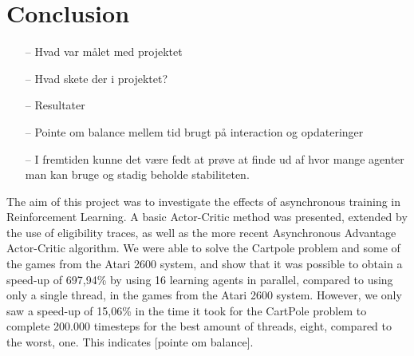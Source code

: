 \documentclass[11pt]{article}
\begin{document}
\section{Conclusion}

\begin{itemize}
    \item[--] Hvad var målet med projektet
    \item[--] Hvad skete der i projektet?
    \item[--] Resultater
    \item[--] Pointe om balance mellem tid brugt på interaction og opdateringer
    \item[--] I fremtiden kunne det være fedt at prøve at finde ud af hvor mange agenter man kan bruge og stadig beholde stabiliteten.
\end{itemize}


The aim of this project was to investigate the effects of asynchronous
training in Reinforcement Learning.
A basic Actor-Critic method was presented, extended by the use of eligibility traces,
as well as the more recent Asynchronous Advantage Actor-Critic algorithm.
We were able to solve the Cartpole problem and some of the games from the
Atari 2600 system, and show that it was possible to obtain a
speed-up of 697,94\% by using 16 learning agents in parallel, compared to
using only a single thread, in the games from the Atari 2600 system.
However, we only saw a speed-up of 15,06\% in the time it took for the CartPole problem
to complete 200.000 timesteps for the best amount of threads, eight, compared to the
worst, one.
This indicates [pointe om balance].
\end{document}
